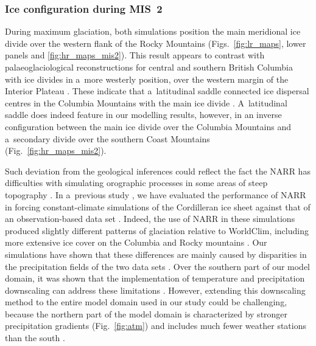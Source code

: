 \documentclass[tc, manuscript]{copernicus}
\begin{document}
\subsubsection{Ice configuration during MIS~2}
\label{sec:mis2}

      During maximum glaciation, both simulations position the main
      meridional ice divide over the western flank of the Rocky Mountains
      (Figs.~\ref{fig:lr_maps}, lower panels and \ref{fig:hr_maps_mis2}).
      This result appears to contrast with palaeoglaciological
      reconstructions for central and southern British Columbia with ice
      divides in a~more westerly position, over the western margin of the
      Interior Plateau \citep{Ryder.etal.1991, Stumpf.etal.2000,
      Kleman.etal.2010, Clague.Ward.2011, Margold.etal.2013a}. These
      indicate that a~latitudinal saddle connected ice dispersal centres in
      the Columbia Mountains with the main ice divide
      \citep{Ryder.etal.1991, Kleman.etal.2010, Clague.Ward.2011,
      Margold.etal.2013a}. A~latitudinal saddle does indeed feature in our
      modelling results, however, in an inverse configuration between the
      main ice divide over the Columbia Mountains and a~secondary divide
      over the southern Coast Mountains (Fig.~\ref{fig:hr_maps_mis2}).

      Such deviation from the geological inferences could reflect the fact
      the NARR has difficulties with simulating orographic processes in some
      areas of steep topography \citep{Jarosch.etal.2012}. In a~previous
      study \citep{Seguinot.etal.2014}, we have evaluated the performance of
      NARR in forcing constant-climate simulations of the Cordilleran ice
      sheet against that of an observation-based data set
      \citep[WorldClim,][]{Hijmans.etal.2005}. Indeed, the use of NARR in
      these simulations produced slightly different patterns of glaciation
      relative to WorldClim, including more extensive ice cover on the
      Columbia and Rocky mountains \citep[Figs.~6--7]{Seguinot.etal.2014}.
      Our simulations have shown that these differences are mainly caused by
      disparities in the precipitation fields of the two data sets
      \citep[Figs.13--14]{Seguinot.etal.2014}. Over the southern part of our
      model domain, it was shown that the implementation of temperature and
      precipitation downscaling can address these limitations
      \citep[e.g.,][]{Jarosch.etal.2012}. However, extending this
      downscaling method to the entire model domain used in our study could
      be challenging, because the northern part of the model domain is
      characterized by stronger precipitation gradients (Fig.~\ref{fig:atm})
      and includes much fewer weather stations than the south
      \citep{Hijmans.etal.2005}.
\end{document}
